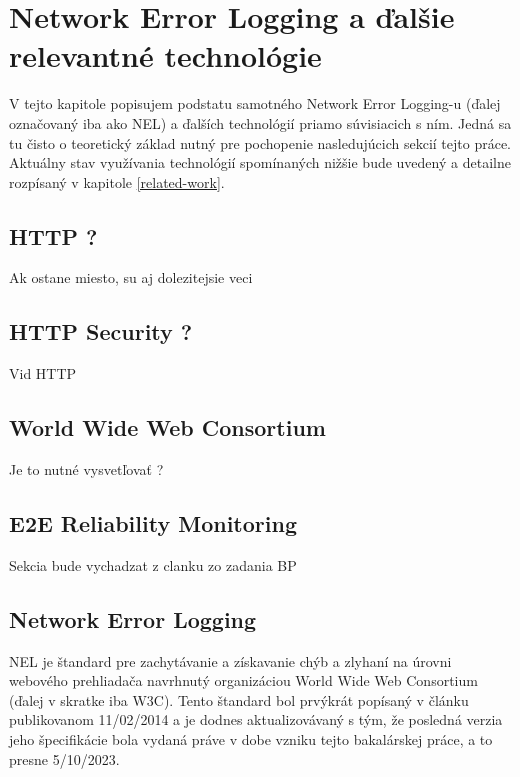 \chapter{Network Error Logging a ďalšie relevantné technológie}
\label{nel-and-related-technologies}


V tejto kapitole popisujem podstatu samotného Network Error Logging-u (ďalej označovaný iba ako NEL) a ďalších technológií priamo súvisiacich s ním. Jedná sa tu čisto o teoretický základ nutný pre pochopenie nasledujúcich sekcií tejto práce. Aktuálny stav využívania technológií spomínaných nižšie bude uvedený a detailne rozpísaný v kapitole \ref{related-work}.

\section{HTTP ?}

Ak ostane miesto, su aj dolezitejsie veci

\section{HTTP Security ?}

Vid HTTP

\section{World Wide Web Consortium}

Je to nutné vysvetľovať ?

\section{E2E Reliability Monitoring}

Sekcia bude vychadzat z clanku zo zadania BP \cite{nel-client-side-measurement-e2e-reliability}


\section{Network Error Logging}


NEL je štandard pre zachytávanie a získavanie chýb a zlyhaní na úrovni webového prehliadača navrhnutý organizáciou World Wide Web Consortium (ďalej v skratke iba W3C). Tento štandard bol prvýkrát popísaný v článku publikovanom 11/02/2014 a je dodnes aktualizovávaný s tým, že posledná verzia jeho špecifikácie bola vydaná práve v dobe vzniku tejto bakalárskej práce, a to presne 5/10/2023. 

